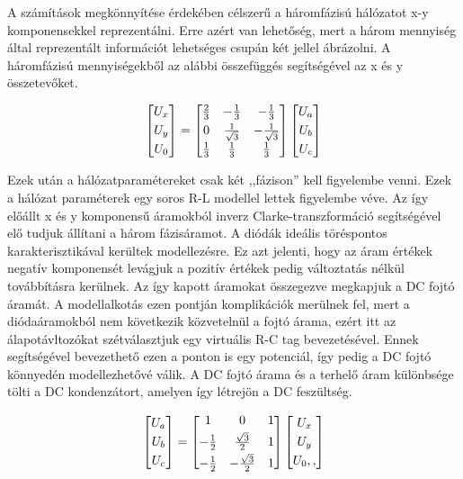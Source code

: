 A számítások megkönnyítése érdekében célszerű a háromfázisú hálózatot x-y komponensekkel reprezentálni. Erre azért van lehetőség, mert a három mennyiség által reprezentált információt lehetséges csupán két jellel ábrázolni. A háromfázisú mennyiségekből az alábbi összefüggés segítségével az x és y összetevőket.

\begin{equation}
$$
\centering
\begin{bmatrix}
       U_x\\[0.3em]
       U_y\\[0.3em]
       U_0 
\end{bmatrix}
=
\begin{bmatrix}
       \frac{2}{3} & -\frac{1}{3} & -\frac{1}{3}  \\[0.3em]
       0 & \frac{1}{\sqrt{3}} & -\frac{1}{\sqrt{3}}  \\[0.3em]
       \frac{1}{3} & \frac{1}{3} & \frac{1}{3}    
\end{bmatrix}
\begin{bmatrix}
       U_a\\[0.3em]
       U_b\\[0.3em]
       U_c    
\end{bmatrix}
$$
\end{equation}

Ezek után a hálózatparamétereket csak két ,,fázison'' kell figyelembe venni.  Ezek a hálózat paraméterek egy soros R-L modellel lettek figyelembe véve. Az így előállt x és y komponensű áramokból inverz Clarke-transzformáció segítségével elő tudjuk állítani a három fázisáramot. A diódák ideális töréspontos karakterisztikával kerültek modellezésre. Ez azt jelenti, hogy az áram értékek negatív komponensét levágjuk a pozitív értékek pedig változtatás nélkül továbbításra kerülnek. Az így kapott áramokat összegezve megkapjuk a DC fojtó áramát. A modellalkotás ezen pontján komplikációk merülnek fel, mert a diódaáramokból nem következik közvetelnül a fojtó árama, ezért itt az álapotávltozókat szétválasztjuk egy virtuális R-C tag bevezetésével. Ennek segítségével bevezethető ezen a ponton is egy potenciál, így pedig a DC fojtó könnyedén modellezhetővé válik. A DC fojtó árama és a terhelő áram különbsége tölti a DC kondenzátort, amelyen így létrejön a DC feszültség.


\begin{equation}
$$
\centering
\begin{bmatrix}
       U_a\\[0.3em]
       U_b\\[0.3em]
       U_c          
\end{bmatrix}
=
\begin{bmatrix}
       1 & 0 & 1  \\[0.3em]
       -\frac{1}{2} & \frac{\sqrt{3}}{2} & 1  \\[0.3em]
       -\frac{1}{2} & -\frac{\sqrt{3}}{2} & 1 
\end{bmatrix}
\begin{bmatrix}
       U_x\\[0.3em]
       U_y\\[0.3em]
       U_0,,        
\end{bmatrix}
$$    
\end{equation}


